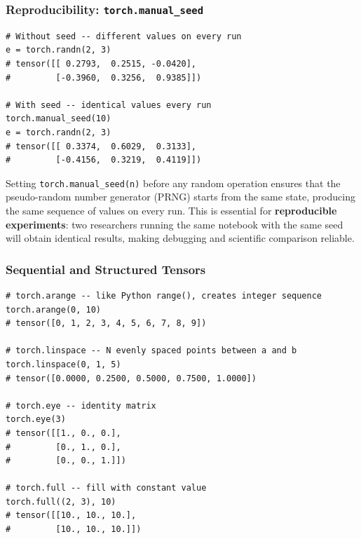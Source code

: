 \documentclass[12pt,a4paper]{article}
\newcommand{\tbf}[1]{\textbf{#1}}
\newcommand{\ttt}[1]{\texttt{#1}}
\begin{document}
\subsubsection{Reproducibility: \ttt{torch.manual\_seed}}

\begin{lstlisting}[caption={Random seed for reproducibility (V06, 00:30:04).},
                   label={lst:seed}]
# Without seed -- different values on every run
e = torch.randn(2, 3)
# tensor([[ 0.2793,  0.2515, -0.0420],
#         [-0.3960,  0.3256,  0.9385]])

# With seed -- identical values every run
torch.manual_seed(10)
e = torch.randn(2, 3)
# tensor([[ 0.3374,  0.6029,  0.3133],
#         [-0.4156,  0.3219,  0.4119]])
\end{lstlisting}

\begin{keyinsight}[title=Why Seeds Matter]
Setting \ttt{torch.manual\_seed(n)} before any random operation ensures
that the pseudo-random number generator (PRNG) starts from the same state,
producing the same sequence of values on every run. This is essential for
\tbf{reproducible experiments}: two researchers running the same notebook
with the same seed will obtain identical results, making debugging and
scientific comparison reliable.
\end{keyinsight}

\subsubsection{Sequential and Structured Tensors}

\begin{lstlisting}[caption={\ttt{arange}, \ttt{linspace}, \ttt{eye}, \ttt{full}
                   (V07--V08, 00:33:05--00:35:05).},
                   label={lst:structured}]
# torch.arange -- like Python range(), creates integer sequence
torch.arange(0, 10)
# tensor([0, 1, 2, 3, 4, 5, 6, 7, 8, 9])

# torch.linspace -- N evenly spaced points between a and b
torch.linspace(0, 1, 5)
# tensor([0.0000, 0.2500, 0.5000, 0.7500, 1.0000])

# torch.eye -- identity matrix
torch.eye(3)
# tensor([[1., 0., 0.],
#         [0., 1., 0.],
#         [0., 0., 1.]])

# torch.full -- fill with constant value
torch.full((2, 3), 10)
# tensor([[10., 10., 10.],
#         [10., 10., 10.]])
\end{lstlisting}
\end{document}
